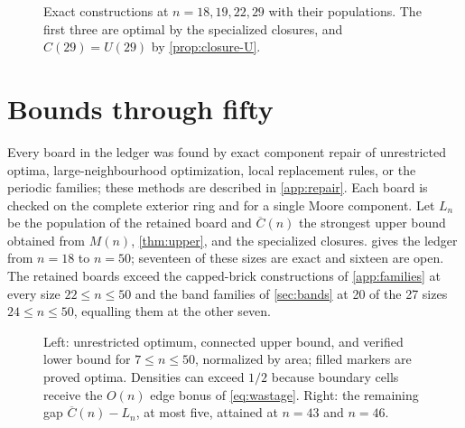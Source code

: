 \documentclass[10pt]{article}
\theoremstyle{remark}
\begin{document}
\begin{figure}[t]
\centering

\caption{Exact constructions at $n=18,19,22,29$ with their populations.  The
first three are optimal by the specialized closures, and $C(29)=U(29)$ by
\cref{prop:closure-U}.}
\label{fig:new-exact}
\end{figure}

\section{Bounds through fifty}\label{sec:bounds50}

Every board in the ledger was found by exact component repair of unrestricted
optima, large-neighbourhood optimization, local replacement rules, or the
periodic families; these methods are described in \cref{app:repair}.  Each board
is checked on the complete exterior ring and for a single Moore component.  Let
$L_n$ be the population of the retained board and $\overline C(n)$ the
strongest upper bound obtained from $M(n)$, \cref{thm:upper}, and the
specialized closures.   gives the ledger from $n=18$ to
$n=50$; seventeen of these sizes are exact and sixteen are open.  The retained
boards exceed the capped-brick constructions of \cref{app:families} at every
size $22\le n\le50$ and the band families of \cref{sec:bands} at 20 of the 27
sizes $24\le n\le50$, equalling them at the other seven.

\begin{table}[t]
\centering
\caption{Rigorous connected bounds for $18\le n\le50$: $L_n$ is the verified
construction, $M(n)$ the unrestricted optimum, $U(n)$ the bound of
\cref{thm:upper}, and $\overline C(n)$ the final upper bound.  The dagger marks
the specialized exclusions at $n=18,19,22$.  At $n=18,20,23,28,31,36,39,44,47$
the unrestricted optimum satisfies $M(n)\le U(n)$; elsewhere the boundary bound
is strictly stronger.}
\label{tab:bounds}
\small

\end{table}

\begin{figure}[t]
\centering
\begin{minipage}{.49\textwidth}
\centering

\end{minipage}\hfill
\begin{minipage}{.49\textwidth}
\centering

\end{minipage}
\caption{Left: unrestricted optimum, connected upper bound, and verified lower
bound for $7\le n\le50$, normalized by area; filled markers are proved optima.
Densities can exceed $1/2$ because boundary cells receive the $O(n)$ edge bonus
of \eqref{eq:wastage}.  Right: the remaining gap $\overline C(n)-L_n$, at most
five, attained at $n=43$ and $n=46$.}
\label{fig:ledger}
\end{figure}
\end{document}
